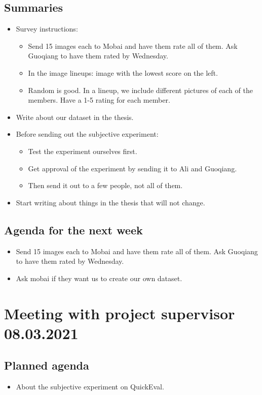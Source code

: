 \subsection*{Summaries}
\begin{itemize}
    \item Survey instructions:
    \begin{itemize}
        \item Send 15 images each to Mobai and have them rate all of them. Ask Guoqiang to have them rated by Wednesday.
        \item In the image lineups: image with the lowest score on the left.
        \item Random is good. In a lineup, we include different pictures of each of the members. Have a 1-5 rating for each member.
    \end{itemize}
    \item Write about our dataset in the thesis.
    \item Before sending out the subjective experiment:
    \begin{itemize}
        \item Test the experiment ourselves first.
        \item Get approval of the experiment by sending it to Ali and Guoqiang.
        \item Then send it out to a few people, not all of them.
    \end{itemize}
    \item Start writing about things in the thesis that will not change.
\end{itemize}

\subsection*{Agenda for the next week}
\begin{itemize}
    \item Send 15 images each to Mobai and have them rate all of them. Ask Guoqiang to have them rated by Wednesday.
    \item Ask mobai if they want us to create our own dataset.
\end{itemize}



\section*{Meeting with project supervisor 08.03.2021}
\subsection*{Planned agenda}
\begin{itemize}
    \item About the subjective experiment on QuickEval.
\end{itemize}

